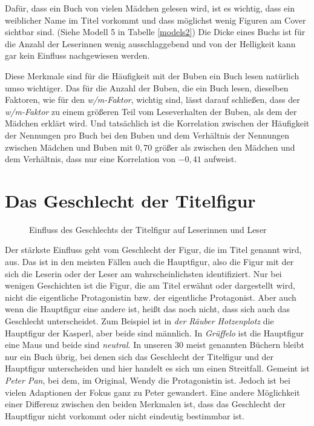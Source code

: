 Dafür, dass ein Buch von vielen Mädchen gelesen wird, ist es wichtig,
dass ein weiblicher Name im Titel vorkommt und dass möglichst wenig
Figuren am Cover sichtbar sind. (Siehe Modell 5 in Tabelle
\ref{models2}) Die Dicke eines Buchs ist für die Anzahl der Leserinnen
wenig ausschlaggebend und von der Helligkeit kann gar kein Einfluss
nachgewiesen werden.

Diese Merkmale sind für die Häufigkeit mit der Buben ein Buch lesen
natürlich umso wichtiger. Das für die Anzahl der Buben, die ein Buch
lesen, dieselben Faktoren, wie für den \emph{w/m-Faktor}, wichtig sind,
lässt darauf schließen, dass der \emph{w/m-Faktor} zu einem größeren
Teil vom Leseverhalten der Buben, als dem der Mädchen erklärt wird. Und
tatsächlich ist die Korrelation zwischen der Häufigkeit der Nennungen
pro Buch bei den Buben und dem Verhältnis der Nennungen zwischen Mädchen
und Buben mit $0{,}70$ größer als zwischen den Mädchen und dem
Verhältnis, dass nur eine Korrelation von $-0{,}41$ aufweist.

\section{Das Geschlecht der Titelfigur}

\begin{figure}
\center
  \label{titelfig}
  \small

  \caption[Einfluss des Geschlechts der Titelfigur]{Einfluss des Geschlechts der Titelfigur auf Leserinnen und Leser}
\end{figure}

Der stärkste Einfluss geht vom Geschlecht der Figur, die im Titel
genannt wird, aus. Das ist in den meisten Fällen auch die Hauptfigur,
also die Figur mit der sich die Leserin oder der Leser am
wahrscheinlichsten identifiziert. Nur bei wenigen Geschichten ist die
Figur, die am Titel erwähnt oder dargestellt wird, nicht die eigentliche
Protagonistin bzw. der eigentliche Protagonist. Aber auch wenn die
Hauptfigur eine andere ist, heißt das noch nicht, dass sich auch das
Geschlecht unterscheidet. Zum Beispiel ist in \emph{der Räuber
Hotzenplotz} die Hauptfigur der Kasperl, aber beide sind männlich. In
\emph{Grüffelo} ist die Hauptfigur eine Maus und beide sind
\emph{neutral}. In unseren 30 meist genannten Büchern bleibt nur ein
Buch übrig, bei denen sich das Geschlecht der Titelfigur und der
Hauptfigur unterscheiden und hier handelt es sich um einen Streitfall.
Gemeint ist \emph{Peter Pan}, bei dem, im Original, Wendy die
Protagonistin ist. Jedoch ist bei vielen Adaptionen der Fokus ganz zu
Peter gewandert. Eine andere Möglichkeit einer Differenz zwischen den
beiden Merkmalen ist, dass das Geschlecht der Hauptfigur nicht vorkommt
oder nicht eindeutig bestimmbar ist.

